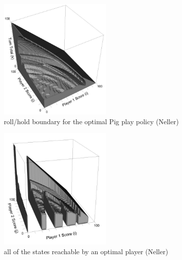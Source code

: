 \documentclass[a4paper,titlepage]{article}
\begin{document}
\begin{figure}
\centering
\includegraphics[width=0.5\textwidth]{neller_optimal_solution}
\caption{roll\slash hold boundary for the optimal Pig play policy (Neller)\label{figure1}}
\end{figure}
\begin{figure}
\centering
\includegraphics[width=0.5\textwidth]{neller_optimal_solution_2}
\caption{all of the states reachable by an optimal player (Neller)\label{figure2}}
\end{figure}
\end{document}
